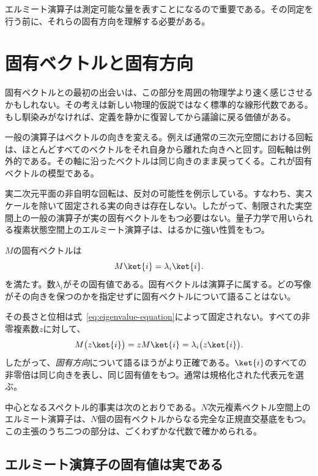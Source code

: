 エルミート演算子は測定可能な量を表すことになるので重要である。その同定を行う前に、それらの固有方向を理解する必要がある。

\section{固有ベクトルと固有方向}

固有ベクトルとの最初の出会いは、この部分を周囲の物理学より速く感じさせるかもしれない。その考えは新しい物理的仮説ではなく標準的な線形代数である。もし馴染みがなければ、定義を静かに復習してから議論に戻る価値がある。

一般の演算子はベクトルの向きを変える。例えば通常の三次元空間における回転は、ほとんどすべてのベクトルをそれ自身から離れた向きへと回す。回転軸は例外的である。その軸に沿ったベクトルは同じ向きのまま戻ってくる。これが固有ベクトルの模型である。

実二次元平面の非自明な回転は、反対の可能性を例示している。すなわち、実スケールを除いて固定される実の向きは存在しない。したがって、制限された実空間上の一般の演算子が実の固有ベクトルをもつ必要はない。量子力学で用いられる複素状態空間上のエルミート演算子は、はるかに強い性質をもつ。

\(M\)の固有ベクトルは
\begin{equation}
M\ket{i}=\lambda_i\ket{i}.
\label{eq:eigenvalue-equation}
\end{equation}
を満たす。数\(\lambda_i\)がその固有値である。固有ベクトルは演算子に属する。どの写像がその向きを保つのかを指定せずに固有ベクトルについて語ることはない。

その長さと位相は式~\eqref{eq:eigenvalue-equation}によって固定されない。すべての非零複素数\(z\)に対して、
\[
M\bigl(z\ket{i}\bigr)
=zM\ket{i}
=\lambda_i\bigl(z\ket{i}\bigr).
\]
したがって、\emph{固有方向}について語るほうがより正確である。\(\ket{i}\)のすべての非零倍は同じ向きを表し、同じ固有値をもつ。通常は規格化された代表元を選ぶ。

中心となるスペクトル的事実は次のとおりである。\(N\)次元複素ベクトル空間上のエルミート演算子は、\(N\)個の固有ベクトルからなる完全な正規直交基底をもつ。この主張のうち二つの部分は、ごくわずかな代数で確かめられる。

\subsection{エルミート演算子の固有値は実である}

